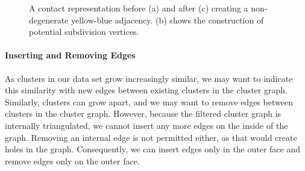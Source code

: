 \begin{figure}[H]
	\centering
	\quad
	\quad
	\caption{A contact representation before (a) and after (c) creating a non-degenerate yellow-blue adjacency. (b) shows the construction of potential subdivision vertices.}
	\label{fig:flip-edge-create-boundary}
\end{figure}



\paragraph{Inserting and Removing Edges}

As clusters in our data set grow increasingly similar, we may want to indicate this similarity with new edges between existing clusters in the cluster graph.
Similarly, clusters can grow apart, and we may want to remove edges between clusters in the cluster graph.
However, because the filtered cluster graph is internally triangulated, we cannot insert any more edges on the inside of the graph.
Removing an internal edge is not permitted either, as that would create holes in the graph.
Consequently, we can insert edges only in the outer face and remove edges only on the outer face.

